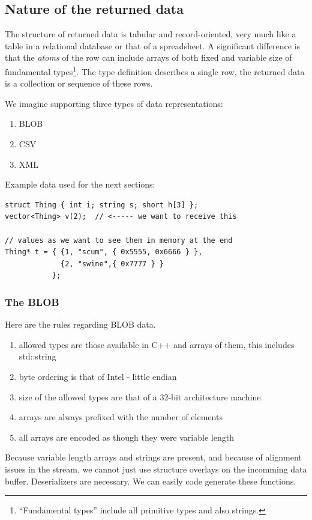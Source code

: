 \subsection{Nature of the returned data}

The structure of returned data is tabular and
record-oriented, very much like a table in a relational database or that
of a spreadsheet.
A significant difference is that the \emph{atoms} of the row can include
arrays of both fixed and variable size of fundamental \cpp
types\footnote{``Fundamental types'' include all primitive types and
also strings.}.  The type definition describes a single row, the
returned data is a collection or sequence of these rows.

We imagine supporting three types of data representations:
\begin{enumerate}
\item BLOB
\item CSV
\item XML
\end{enumerate}

Example data used for the next sections:
\begin{verbatim}
struct Thing { int i; string s; short h[3] };
vector<Thing> v(2);  // <----- we want to receive this

// values as we want to see them in memory at the end
Thing* t = { {1, "scum", { 0x5555, 0x6666 } },
             {2, "swine",{ 0x7777 } }
           };
\end{verbatim}

\subsubsection{The BLOB}
Here are the rules regarding BLOB data.

\begin{enumerate}
\item allowed types are those available in C++ and arrays of them, this includes std::string
\item byte ordering is that of Intel - little endian
\item size of the allowed types are that of a 32-bit architecture machine.
\item arrays are always prefixed with the number of elements
\item all arrays are encoded as though they were variable length
\end{enumerate}

Because variable length arrays and strings are present, and because of
alignment issues in the stream, we cannot just use structure overlays
on the incomming data buffer.  Deserializers are necessary.  We can easily code
generate these functions.

